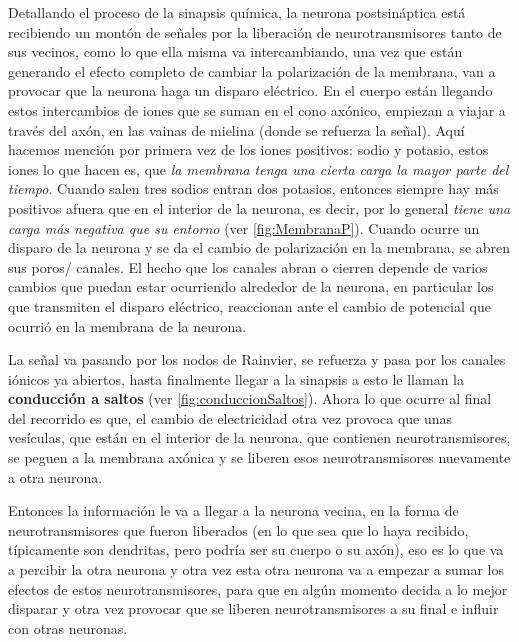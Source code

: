 



Detallando el proceso de la sinapsis química, la neurona postsináptica está recibiendo un montón de señales por la liberación de neurotransmisores tanto de sus vecinos, como lo que ella misma va intercambiando, una vez que están generando el efecto completo de cambiar la polarización de la membrana, van a provocar que la neurona haga un disparo eléctrico. En el cuerpo están llegando estos intercambios de iones que se suman en el cono axónico, empiezan a viajar a través del axón, en las vainas de mielina (donde se refuerza la señal). 
Aquí hacemos mención por primera vez de los iones positivos: sodio y potasio, estos iones lo que hacen es, que \emph{la membrana tenga una cierta carga la mayor parte del tiempo}. Cuando salen tres sodios entran dos potasios, entonces siempre hay más positivos afuera que en el interior de la neurona, es decir, por lo general  \emph{tiene una carga más negativa que su entorno} (ver \ref{fig:MembranaP}). Cuando ocurre un disparo de la neurona y se da el cambio de polarización en la membrana, se abren sus poros/ canales. El hecho que los canales abran o cierren depende de varios cambios que puedan estar ocurriendo alrededor de la neurona, en particular los que transmiten el disparo eléctrico, reaccionan ante el cambio de potencial que ocurrió en la membrana de la neurona. 


La señal va pasando por los nodos de Rainvier, se refuerza y pasa por los canales iónicos ya abiertos, hasta finalmente llegar a la sinapsis a esto le llaman la \textbf{conducción a saltos} (ver \ref{fig:conduccionSaltos}). Ahora lo que ocurre al final del recorrido es que, el cambio de electricidad otra vez provoca que unas vesículas, que están en el interior de la neurona, que contienen neurotransmisores, se peguen a la membrana axónica y se liberen esos neurotransmisores nuevamente a otra neurona. 


Entonces la información le va a llegar a la neurona vecina, en la forma de neurotransmisores que fueron liberados (en lo que sea que lo haya recibido, típicamente son dendritas, pero podría ser su cuerpo o su axón), eso es lo que va a percibir la otra neurona y otra vez esta otra neurona va a empezar a sumar los efectos de estos neurotransmisores, para que en algún momento decida a lo mejor disparar y otra vez provocar que se liberen neurotransmisores a su final e influir con otras neuronas.


